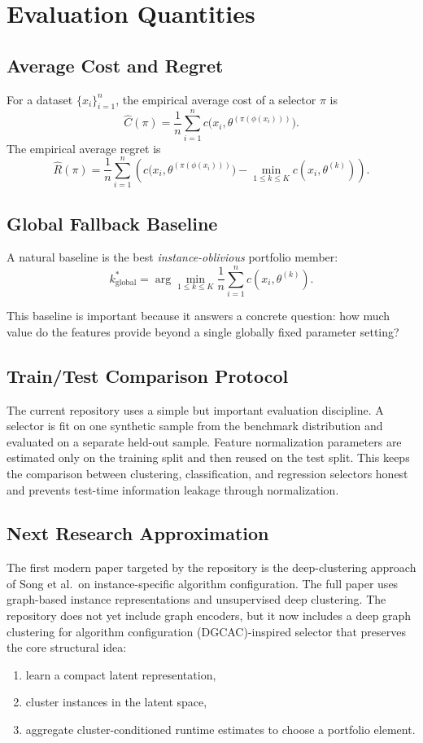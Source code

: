 \documentclass[11pt]{report}
\begin{document}
\chapter{Evaluation Quantities}

\section{Average Cost and Regret}

For a dataset $\{x_i\}_{i=1}^n$, the empirical average cost of a selector $\pi$ is
\[
\hat{C}(\pi) = \frac{1}{n} \sum_{i=1}^n c\bigl(x_i, \theta^{(\pi(\phi(x_i)))}\bigr).
\]
The empirical average regret is
\[
\hat{R}(\pi) = \frac{1}{n} \sum_{i=1}^n
\left(
c\bigl(x_i, \theta^{(\pi(\phi(x_i)))}\bigr) -
\min_{1 \le k \le K} c(x_i, \theta^{(k)})
\right).
\]

\section{Global Fallback Baseline}

A natural baseline is the best \emph{instance-oblivious} portfolio member:
\[
k_{\mathrm{global}}^* =
\arg\min_{1 \le k \le K}
\frac{1}{n} \sum_{i=1}^n c(x_i, \theta^{(k)}).
\]

This baseline is important because it answers a concrete question: how much value do the features provide beyond a single globally fixed parameter setting?

\section{Train/Test Comparison Protocol}

The current repository uses a simple but important evaluation discipline. A selector is fit on one synthetic sample from the benchmark distribution and evaluated on a separate held-out sample. Feature normalization parameters are estimated only on the training split and then reused on the test split. This keeps the comparison between clustering, classification, and regression selectors honest and prevents test-time information leakage through normalization.

\section{Next Research Approximation}

The first modern paper targeted by the repository is the deep-clustering approach of Song et al.\ on instance-specific algorithm configuration. The full paper uses graph-based instance representations and unsupervised deep clustering. The repository does not yet include graph encoders, but it now includes a deep graph clustering for algorithm configuration (DGCAC)-inspired selector that preserves the core structural idea:
\begin{enumerate}[leftmargin=2em]
\item learn a compact latent representation,
\item cluster instances in the latent space,
\item aggregate cluster-conditioned runtime estimates to choose a portfolio element.
\end{enumerate}
\end{document}
